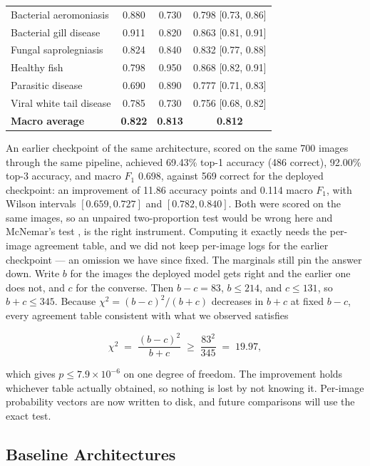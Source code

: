 \documentclass[conference]{IEEEtran}
\begin{document}
\begin{table}[!t]
\begin{tabular}{lccc}
Bacterial aeromoniasis & 0.880 & 0.730 & 0.798 [0.73, 0.86]\\
Bacterial gill disease & 0.911 & 0.820 & 0.863 [0.81, 0.91]\\
Fungal saprolegniasis & 0.824 & 0.840 & 0.832 [0.77, 0.88]\\
Healthy fish & 0.798 & 0.950 & 0.868 [0.82, 0.91]\\
Parasitic disease & 0.690 & 0.890 & 0.777 [0.71, 0.83]\\
Viral white tail disease & 0.785 & 0.730 & 0.756 [0.68, 0.82]\\
\midrule
\textbf{Macro average} & \textbf{0.822} & \textbf{0.813} & \textbf{0.812}\\
\bottomrule
\end{tabular}
\end{table}

An earlier checkpoint of the same architecture, scored on the same 700 images through the same pipeline, achieved 69.43\% top-1 accuracy (486 correct), 92.00\% top-3 accuracy, and macro $F_1$ 0.698, against 569 correct for the deployed checkpoint: an improvement of 11.86 accuracy points and 0.114 macro $F_1$, with Wilson intervals $[0.659,0.727]$ and $[0.782,0.840]$. Both were scored on the same images, so an unpaired two-proportion test would be wrong here and McNemar's test \cite{b16}, \cite{b18} is the right instrument. Computing it exactly needs the per-image agreement table, and we did not keep per-image logs for the earlier checkpoint --- an omission we have since fixed. The marginals still pin the answer down. Write $b$ for the images the deployed model gets right and the earlier one does not, and $c$ for the converse. Then $b-c=83$, $b\leq214$, and $c\leq131$, so $b+c\leq345$. Because $\chi^2=(b-c)^2/(b+c)$ decreases in $b+c$ at fixed $b-c$, every agreement table consistent with what we observed satisfies

\begin{equation}
\chi^{2} \;=\; \frac{(b-c)^{2}}{b+c} \;\geq\; \frac{83^{2}}{345} \;=\; 19.97,
\label{eq:mcnemar}
\end{equation}

which gives $p \leq 7.9\times10^{-6}$ on one degree of freedom. The improvement holds whichever table actually obtained, so nothing is lost by not knowing it. Per-image probability vectors are now written to disk, and future comparisons will use the exact test.

\subsection{Baseline Architectures}
\label{subsec:baselines}
\end{document}
